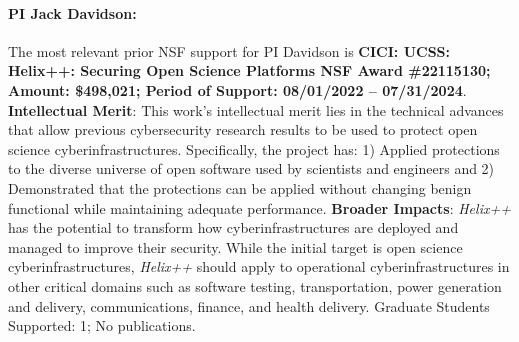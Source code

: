 
\newenvironment{itemizet}{
  \begin{itemize}
  \setlength{\itemsep}{1pt}
  \setlength{\parskip}{0pt}
  \setlength{\parsep}{0pt}}{\end{itemize}
}



\paragraph{PI Jack Davidson:}  The most relevant prior NSF support for PI Davidson is  
\textbf{CICI: UCSS: Helix++: Securing Open Science Platforms  
NSF Award \#22115130; Amount: \$498,021; Period of Support: 08/01/2022 -- 07/31/2024}. 
\textbf{Intellectual Merit}: This work's intellectual merit lies in the technical advances 
that allow previous cybersecurity research results to be used to protect open science cyberinfrastructures.
Specifically, the project has:
1)
Applied protections to the diverse universe of open software used by scientists and engineers and 2)
Demonstrated that the protections can be applied without changing benign functional while maintaining adequate performance.
\textbf{Broader Impacts}:
\textit{Helix++} has the potential to transform how cyberinfrastructures are deployed and managed to improve their security.
While the initial target is open science cyberinfrastructures, \textit{Helix++} should apply to operational cyberinfrastructures 
in other critical domains such as software testing, transportation, power generation and delivery, communications, finance, and health delivery.
Graduate Students Supported: 1; No publications.


